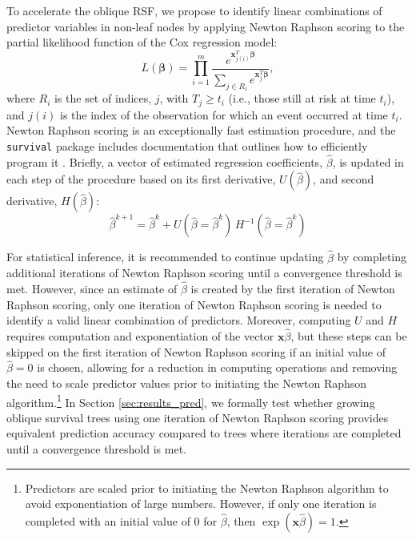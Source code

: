 \documentclass{article}\usepackage[]{graphicx}\usepackage[]{xcolor}
\newcommand{\secref}[1]{Section \ref{#1}}
\begin{document}
To accelerate the oblique RSF, we propose to identify linear combinations of predictor variables in non-leaf nodes by applying Newton Raphson scoring to the partial likelihood function of the Cox regression model:
\begin{equation}\label{eqn:cox-partial-likelihood}
L(\bm\beta) = \prod_{i=1}^m \frac{e^{\bm{x}_{j(i)}^T \bm\beta}}{\sum_{j \in R_i} e^{\bm{x}_j^T \bm\beta}},
\end{equation}
where $R_i$ is the set of indices, $j$, with $T_j \geq t_i$ (i.e., those still at risk at time $t_i$), and $j(i)$ is the index of the observation for which an event occurred at time $t_i$. Newton Raphson scoring is an exceptionally fast estimation procedure, and the \texttt{survival} package includes documentation that outlines how to efficiently program it \citep{therneau_survival_2022}. Briefly, a vector of estimated regression coefficients, $\hat{\beta}$, is updated in each step of the procedure based on its first derivative, $U(\hat{\beta})$, and second derivative, $H(\hat{\beta})$:
$$ \hat{\beta}^{k+1} =  \hat{\beta}^{k} + U(\hat{\beta} = \hat{\beta}^{k})\, H^{-1}(\hat{\beta} = \hat{\beta}^{k}) $$

For statistical inference, it is recommended to continue updating $\hat{\beta}$ by completing additional iterations of Newton Raphson scoring until a convergence threshold is met. However, since an estimate of $\hat{\beta}$ is created by the first iteration of Newton Raphson scoring, only one iteration of Newton Raphson scoring is needed to identify a valid linear combination of predictors. Moreover, computing $U$ and $H$ requires computation and exponentiation of the vector $\bm{x}\hat{\beta}$, but these steps can be skipped on the first iteration of Newton Raphson scoring if an initial value of $\hat{\beta} = 0$ is chosen, allowing for a reduction in computing operations and removing the need to scale predictor values prior to initiating the Newton Raphson algorithm.\footnote{Predictors are scaled prior to initiating the Newton Raphson algorithm to avoid exponentiation of large numbers. However, if only one iteration is completed with an initial value of 0 for $\hat{\beta}$, then $\exp(\bm{x}\hat{\beta}) = 1$.} In \secref{sec:results_pred}, we formally test whether growing oblique survival trees using one iteration of Newton Raphson scoring provides equivalent prediction accuracy compared to trees where iterations are completed until a convergence threshold is met.
\end{document}
